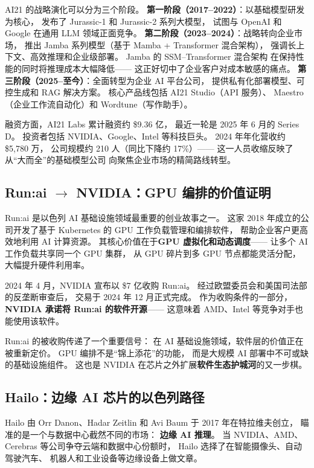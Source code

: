 AI21 的战略演化可以分为三个阶段。
\textbf{第一阶段（2017--2022）}：以基础模型研发为核心，
发布了 Jurassic-1 和 Jurassic-2 系列大模型，
试图与 OpenAI 和 Google 在通用 LLM 领域正面竞争。
\textbf{第二阶段（2023--2024）}：战略转向企业市场，
推出 Jamba 系列模型（基于 Mamba + Transformer 混合架构），
强调长上下文、高效推理和企业级部署。
Jamba 的 SSM--Transformer 混合架构
在保持性能的同时将推理成本大幅降低——
这正好切中了企业客户对成本敏感的痛点。
\textbf{第三阶段（2025--至今）}：全面转型为企业 AI 平台公司，
提供私有化部署模型、可控生成和 RAG 解决方案。
核心产品线包括 AI21 Studio（API 服务）、
Maestro（企业工作流自动化）和 Wordtune（写作助手）。

融资方面，AI21 Labs 累计融资约 \$9.36 亿，
最近一轮是 2025 年 6 月的 Series D。
投资者包括 NVIDIA、Google、Intel 等科技巨头。
2024 年年化营收约 \$5,780 万，
公司规模约 210 人（同比下降约 17\%）——
这一人员收缩反映了从``大而全''的基础模型公司
向聚焦企业市场的精简路线转型。

\subsection{Run:ai $\to$ NVIDIA：GPU 编排的价值证明}

Run:ai 是以色列 AI 基础设施领域最重要的创业故事之一。
这家 2018 年成立的公司开发了基于 Kubernetes 的
GPU 工作负载管理和编排软件，
帮助企业客户更高效地利用 AI 计算资源。
其核心价值在于\textbf{GPU 虚拟化和动态调度}——
让多个 AI 工作负载共享同一个 GPU 集群，
从 GPU 碎片到多 GPU 节点都能灵活分配，
大幅提升硬件利用率。

2024 年 4 月，NVIDIA 宣布以 \$7 亿收购 Run:ai。
经过欧盟委员会和美国司法部的反垄断审查后，
交易于 2024 年 12 月正式完成。
作为收购条件的一部分，
\textbf{NVIDIA 承诺将 Run:ai 的软件开源}——
这意味着 AMD、Intel 等竞争对手也能使用该软件。

Run:ai 的被收购传递了一个重要信号：
在 AI 基础设施领域，软件层的价值正在被重新定价。
GPU 编排不是``锦上添花''的功能，
而是大规模 AI 部署中不可或缺的基础设施组件。
这也是 NVIDIA 在芯片之外扩展\textbf{软件生态护城河}的又一步棋。

\subsection{Hailo：边缘 AI 芯片的以色列路径}

Hailo 由 Orr Danon、Hadar Zeitlin 和 Avi Baum
于 2017 年在特拉维夫创立，
瞄准的是一个与数据中心截然不同的市场：
\textbf{边缘 AI 推理}。
当 NVIDIA、AMD、Cerebras 等公司争夺云端和数据中心份额时，
Hailo 选择了在智能摄像头、自动驾驶汽车、
机器人和工业设备等边缘设备上做文章。

